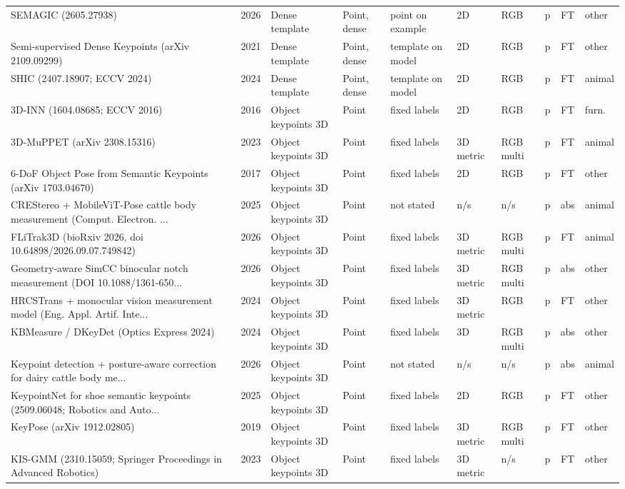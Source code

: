 {\begin{landscape}
\begin{longtable}{@{}p{4.6cm}rp{2.0cm}lllllcl@{}}
SEMAGIC (2605.27938) & 2026 & Dense template & Point, dense & point on example & 2D & RGB & p & FT & other \\
Semi-supervised Dense Keypoints (arXiv 2109.09299) & 2021 & Dense template & Point, dense & template on model & 2D & RGB & p & FT & other \\
SHIC (2407.18907; ECCV 2024) & 2024 & Dense template & Point, dense & template on model & 2D & RGB & p & FT & animal \\
3D-INN (1604.08685; ECCV 2016) & 2016 & Object keypoints 3D & Point & fixed labels & 2D & RGB & p & FT & furn. \\
3D-MuPPET (arXiv 2308.15316) & 2023 & Object keypoints 3D & Point & fixed labels & 3D metric & RGB multi & p & FT & animal \\
6-DoF Object Pose from Semantic Keypoints (arXiv 1703.04670) & 2017 & Object keypoints 3D & Point & fixed labels & 2D & RGB & p & FT & other \\
CREStereo + MobileViT-Pose cattle body measurement (Comput. Electron. ... & 2025 & Object keypoints 3D & Point & not stated & n/s & n/s & p & abs & animal \\
FLiTrak3D (bioRxiv 2026, doi 10.64898/2026.09.07.749842) & 2026 & Object keypoints 3D & Point & fixed labels & 3D metric & RGB multi & p & FT & animal \\
Geometry-aware SimCC binocular notch measurement (DOI 10.1088/1361-650... & 2026 & Object keypoints 3D & Point & fixed labels & 3D metric & RGB multi & p & abs & other \\
HRCSTrans + monocular vision measurement model (Eng. Appl. Artif. Inte... & 2024 & Object keypoints 3D & Point & fixed labels & 3D metric & RGB & p & FT & other \\
KBMeasure / DKeyDet (Optics Express 2024) & 2024 & Object keypoints 3D & Point & fixed labels & 3D & RGB multi & p & abs & other \\
Keypoint detection + posture-aware correction for dairy cattle body me... & 2026 & Object keypoints 3D & Point & not stated & n/s & n/s & p & abs & animal \\
KeypointNet for shoe semantic keypoints (2509.06048; Robotics and Auto... & 2025 & Object keypoints 3D & Point & fixed labels & 2D & RGB & p & FT & other \\
KeyPose (arXiv 1912.02805) & 2019 & Object keypoints 3D & Point & fixed labels & 3D metric & RGB multi & p & FT & other \\
KIS-GMM (2310.15059; Springer Proceedings in Advanced Robotics) & 2023 & Object keypoints 3D & Point & fixed labels & 3D metric & n/s & p & FT & other \\

\end{longtable}
\end{landscape}}
